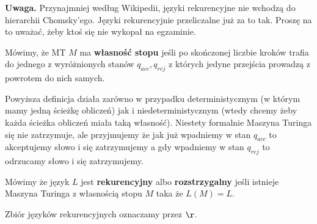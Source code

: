 \textbf{Uwaga.} Przynajmniej według Wikipedii, języki rekurencyjne nie wchodzą do hierarchii Chomsky'ego. Języki rekurencyjnie przeliczalne już za to tak. Proszę na to uważać, żeby ktoś się nie wykopał na egzaminie. 

\begin{definition}
    Mówimy, że MT \( M \) ma \textbf{własność stopu} jeśli po skończonej liczbie kroków trafia do jednego z wyróżnionych stanów \( q_{acc}, q_{rej} \) z których jedyne przejścia prowadzą z powrotem do nich samych.
\end{definition}

Powyższa definicja działa zarówno w przypadku deterministycznym (w którym mamy jedną ścieżkę obliczeń) jak i niedeterministycznym (wtedy chcemy żeby każda ścieżka obliczeń miała taką własność).
Niestety formalnie Maszyna Turinga się nie zatrzymuje, ale przyjmujemy że jak już wpadniemy w stan \( q_{acc} \) to akceptujemy słowo i się zatrzymujemy a gdy wpadniemy w stan \( q_{rej} \) to odrzucamy słowo i się zatrzymujemy.

\begin{definition}
    Mówimy że język \( L \) jest \textbf{rekurencyjny} albo \textbf{rozstrzygalny} jeśli istnieje Maszyna Turinga z własnością stopu \( M \) taka że \( L(M) = L \).
    
    Zbiór języków rekurencyjnych oznaczamy przez \( \r \).
\end{definition}